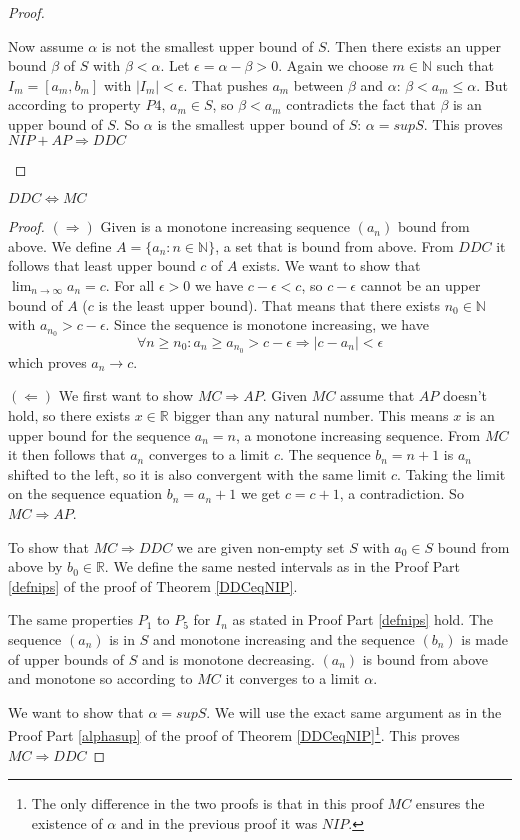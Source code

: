\begin{proof}
\begin{proofpart}
Now assume $\alpha$ is not the smallest upper bound of $S$. Then there exists an upper bound $\beta$ of $S$ with $\beta < \alpha$. Let $\epsilon= \alpha - \beta > 0$. Again we choose $m \in \mathbb{N}$ such that $I_m = [a_m, b_m]$ with $|I_m| < \epsilon$. That pushes $a_m$ between $\beta$ and $\alpha$: $\beta < a_m \leq \alpha$. But according to property $P4$, $a_m \in S$, so $\beta < a_m$ contradicts the fact that $\beta$ is an upper bound of $S$. So $\alpha$ is the smallest upper bound of $S$: $\alpha=sup S$. This proves $NIP+AP \Rightarrow DDC$
\end{proofpart}
\end{proof}

\begin{thm}
$DDC \Leftrightarrow MC$
\end{thm}

\begin{proof}
\noindent$(\Rightarrow)$ Given is a monotone increasing sequence $(a_n)$ bound from above. We define $A = \{a_n: n \in \mathbb{N}\}$, a set that is bound from above. From $DDC$ it follows that least upper bound $c$ of $A$ exists. We want to show that $\lim_{n \to \infty} a_n = c$. For all $\epsilon > 0$ we have $c - \epsilon < c$, so $c - \epsilon$ cannot be an upper bound of $A$ ($c$ is the least upper bound). That means that there exists $n_0 \in \mathbb{N}$ with $a_{n_0} > c - \epsilon$. Since the sequence is monotone increasing, we have
\[
\forall n \geq n_0: a_n \geq a_{n_0} > c - \epsilon \Rightarrow |c - a_n| < \epsilon
\]
which proves $a_n \to c$.

\noindent$(\Leftarrow)$ We first want to show $MC \Rightarrow AP$. Given $MC$ assume that $AP$ doesn't hold, so there exists $x \in \mathbb{R}$ bigger than any natural number. This means $x$ is an upper bound for the sequence $a_n = n$, a monotone increasing sequence. From $MC$ it then follows that $a_n$ converges to a limit $c$. The sequence $b_n = n + 1$ is $a_n$ shifted to the left, so it is also convergent with the same limit $c$. Taking the limit on the sequence equation $b_n = a_n + 1$ we get $c = c + 1$, a contradiction. So $MC \Rightarrow AP$.

To show that $MC \Rightarrow DDC$ we are given non-empty set $S$ with $a_0 \in S$ bound from above by $b_0 \in \mathbb{R}$. We define the same nested intervals as in the Proof Part \ref{defnips} of the proof of Theorem \ref{DDCeqNIP}. 

The same properties $P_1$ to $P_5$ for $I_n$ as stated in Proof Part \ref{defnips} hold. The sequence $(a_n)$ is in $S$ and monotone increasing and the sequence $(b_n)$ is made of upper bounds of $S$ and is monotone decreasing. $(a_n)$ is bound from above and monotone so according to $MC$ it converges to a limit $\alpha$. 

We want to show that $\alpha = supS$. We will use the exact same argument as in the Proof Part \ref{alphasup} of the proof of Theorem \ref{DDCeqNIP}\footnote{The only difference in the two proofs is that in this proof $MC$ ensures the existence of $\alpha$ and in the previous proof it was $NIP$.}. This proves $MC \Rightarrow DDC$
\end{proof}

